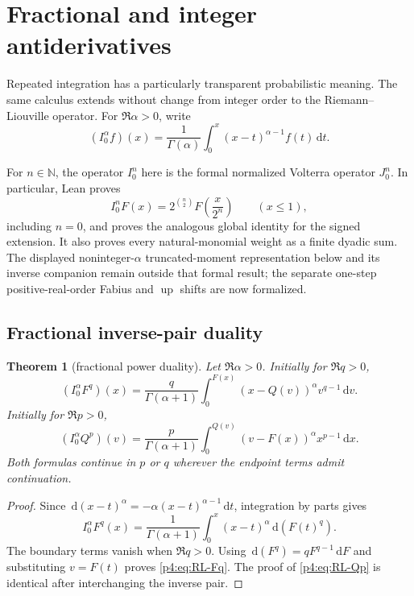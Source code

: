 \documentclass[11pt,oneside]{article}
\newtheorem{theorem}{Theorem}[section]
\theoremstyle{definition}
\theoremstyle{remark}
\newcommand{\F}{F}
\newcommand{\Up}{\operatorname{up}}
\newcommand{\Q}{Q}
\newcommand{\N}{\mathbb N}
\newcommand{\dd}{\,\mathrm d}
\newcommand{\1}{\mathbf 1}
\begin{document}
\section{Fractional and integer antiderivatives}

Repeated integration has a particularly transparent probabilistic meaning.  The same
calculus extends without change from integer order to the Riemann--Liouville operator.
For \(\Re\alpha>0\), write
\begin{equation}\label{p4:eq:RLdef}
 (I_0^\alpha f)(x)
 =\frac1{\Gamma(\alpha)}\int_0^x(x-t)^{\alpha-1}f(t)\dd t.
\end{equation}

\begin{statusbox}
For \(n\in\N\), the operator \(I_0^n\) here is the formal normalized Volterra operator
\(J_0^n\).  In particular, Lean proves
\[
 I_0^n\F(x)=2^{\binom n2}\F\!\left(\frac{x}{2^n}\right)
 \qquad(x\le1),
\]
including \(n=0\), and proves the analogous global identity for the signed extension.
It also proves every natural-monomial weight as a finite dyadic sum.  The displayed
noninteger-\(\alpha\) truncated-moment representation below and its inverse companion
remain outside that formal result; the separate one-step positive-real-order Fabius and \(\Up\)
shifts are now formalized.
\end{statusbox}

\subsection{Fractional inverse-pair duality}

\begin{theorem}[fractional power duality]\label{p4:thm:fractional-duality}
Let \(\Re\alpha>0\).  Initially for \(\Re q>0\),
\begin{equation}\label{p4:eq:RL-Fq}
 (I_0^\alpha\F^q)(x)
 =\frac{q}{\Gamma(\alpha+1)}
 \int_0^{\F(x)}(x-\Q(v))^\alpha v^{q-1}\dd v.
\end{equation}
Initially for \(\Re p>0\),
\begin{equation}\label{p4:eq:RL-Qp}
 (I_0^\alpha\Q^p)(v)
 =\frac{p}{\Gamma(\alpha+1)}
 \int_0^{\Q(v)}(v-\F(x))^\alpha x^{p-1}\dd x.
\end{equation}
Both formulas continue in \(p\) or \(q\) wherever the endpoint terms admit continuation.
\end{theorem}

\begin{proof}
Since \(\dd(x-t)^\alpha=-\alpha(x-t)^{\alpha-1}\dd t\), integration by parts gives
\[
 I_0^\alpha\F^q(x)
 =\frac1{\Gamma(\alpha+1)}
 \int_0^x(x-t)^\alpha\dd(\F(t)^q).
\]
The boundary terms vanish when \(\Re q>0\).  Using
\(\dd(\F^q)=q\F^{q-1}\dd\F\) and substituting \(v=\F(t)\) proves
\cref{p4:eq:RL-Fq}.  The proof of \cref{p4:eq:RL-Qp} is identical after interchanging the
inverse pair.
\end{proof}
\end{document}
